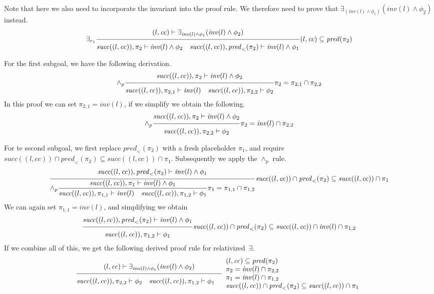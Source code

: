 \documentclass{article}
\newcommand{\proofrule}[3][]{#1 \frac{\raisebox{.7ex}{\normalsize{$#2$}}}
  {\raisebox{-1.0ex}{\normalsize{$#3$}}}}
\newcommand{\placeholder}[1][]{\pi_{#1}}
\newcommand{\loc}{l}
\newcommand{\region}{\mathit{cc}}
\newcommand{\suc}{\mathit{succ}}
\newcommand{\pre}{\mathit{pred}}
\newcommand{\inv}{\mathit{inv}}
\begin{document}
Note that here we also need to incorporate the invariant into the proof rule. We therefore
need to prove that $\exists_{(\inv(\loc) \land \phi_1)}(\inv(\loc) \land \phi_2)$ instead.
\[
\proofrule[\exists_{r_1}]
{(\loc, \region) \vdash \exists_{\inv(\loc) \land \phi_1}(\inv(\loc) \land \phi_2)}
{\suc((\loc,\region)), \placeholder[2] \vdash \inv(\loc) \land \phi_2
\quad
\suc((\loc, \region)), \pre_{<}(\placeholder[2]) \vdash \inv(\loc) \land \phi_1
}
(\loc, \region) \subseteq \pre(\placeholder[2])
\]

For the first subgoal, we have the following derivation.
\[
\proofrule[\land_p]
{\suc((\loc,\region)), \placeholder[2] \vdash \inv(\loc) \land \phi_2}
{\suc((\loc,\region)), \placeholder[2,1] \vdash \inv(\loc)
\quad \suc((\loc,\region)), \placeholder[2,2] \vdash \phi_2}
\placeholder[2] = \placeholder[2,1] \cap \placeholder[2,2]
\]
In this proof we can set $\placeholder[2,1] = \inv(\loc)$, if we simplify we obtain the following.
\[
\proofrule[\land_p]
{\suc((\loc,\region)), \placeholder[2] \vdash \inv(\loc) \land \phi_2}
{\suc((\loc,\region)), \placeholder[2,2] \vdash \phi_2}
\placeholder[2] = \inv(\loc) \cap \placeholder[2,2]
\]

For te second subgoal, we first replace $\pre_{<}(\placeholder[2])$ with a fresh
placeholder $\placeholder[1]$, and require $\suc((\loc, \region)) \cap \pre_{<}(\placeholder[2]) \subseteq \suc((\loc, \region)) \cap \placeholder[1]$.
Subsequently we apply the $\land_p$ rule.
\[
\proofrule
{\suc((\loc, \region)), \pre_{<}(\placeholder[2]) \vdash \inv(\loc) \land \phi_1}
{\proofrule[\land_p]
  {\suc((\loc, \region)), \placeholder[1] \vdash \inv(\loc) \land \phi_1}
  {\suc((\loc, \region)), \placeholder[1,1] \vdash \inv(\loc)
  \quad \suc((\loc, \region)), \placeholder[1,2] \vdash \phi_1}
  \placeholder[1] = \placeholder[1,1] \cap \placeholder[1,2]
}
\suc((\loc, \region)) \cap \pre_{<}(\placeholder[2]) \subseteq \suc((\loc, \region)) \cap \placeholder[1]
\]
We can again set $\placeholder[1,1] = \inv(\loc)$, and simplifying we obtain
\[
\proofrule
{\suc((\loc, \region)), \pre_{<}(\placeholder[2]) \vdash \inv(\loc) \land \phi_1}
{\suc((\loc, \region)), \placeholder[1,2] \vdash \phi_1}
\suc((\loc, \region)) \cap \pre_{<}(\placeholder[2]) \subseteq \suc((\loc, \region)) \cap \inv(\loc) \cap \placeholder[1,2]
\]
%
If we combine all of this, we get the following derived proof rule for relativized~$\exists$.
\[
\proofrule
{(\loc, \region) \vdash \exists_{\inv(\loc) \land \phi_1}(\inv(\loc) \land \phi_2)}
{\suc((\loc,\region)), \placeholder[2,2] \vdash \phi_2
\quad \suc((\loc, \region)), \placeholder[1,2] \vdash \phi_1
\quad }
\begin{array}{l}
(\loc, \region) \subseteq \pre(\placeholder[2]) \\
\placeholder[2] = \inv(\loc) \cap \placeholder[2,2] \\
\placeholder[1] = \inv(\loc) \cap \placeholder[1,2] \\
\suc((\loc, \region)) \cap \pre_{<}(\placeholder[2]) \subseteq \suc((\loc, \region)) \cap \placeholder[1]
\end{array}
\]
\end{document}
